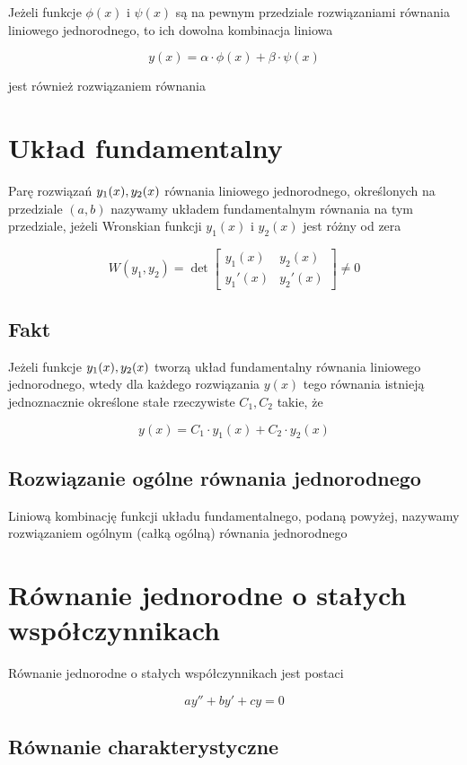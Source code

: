 \documentclass[a4paper,12pt]{article}
\begin{document}
Jeżeli funkcje $\phi(x)$ i $\psi(x)$ są na pewnym przedziale rozwiązaniami równania liniowego jednorodnego, to ich dowolna kombinacja liniowa

$$
y(x) = \alpha\cdot \phi(x) + \beta\cdot \psi(x)
$$

jest również rozwiązaniem równania

\section{Układ fundamentalny}

Parę rozwiązań $y_1(x), \space y_2(x)$ równania liniowego jednorodnego, określonych na przedziale $(a,b)$ nazywamy układem fundamentalnym równania na tym przedziale, jeżeli Wronskian funkcji $y_1(x)$ i $y_2(x)$ jest różny od zera

$$
W(y_1, y_2) = \det
\begin{bmatrix}
   y_1(x) & y_2(x) \\
   y_1'(x) & y_2'(x)
\end{bmatrix}
\ne 0
$$

\subsection{Fakt}

Jeżeli funkcje $y_1(x), \space y_2(x)$ tworzą układ fundamentalny równania liniowego jednorodnego, wtedy dla każdego rozwiązania $y(x)$ tego równania istnieją jednoznacznie określone stałe rzeczywiste $C_1, C_2$ takie, że

$$
y(x) = C_1 \cdot y_1(x) + C_2 \cdot y_2(x)
$$

\subsection{Rozwiązanie ogólne równania jednorodnego}

Liniową kombinację funkcji układu fundamentalnego, podaną powyżej, nazywamy rozwiązaniem ogólnym (całką ogólną) równania jednorodnego

\section{Równanie jednorodne o stałych współczynnikach}

Równanie jednorodne o stałych współczynnikach jest postaci

$$
ay'' + by' +cy = 0
$$

\subsection{Równanie charakterystyczne}
\end{document}
